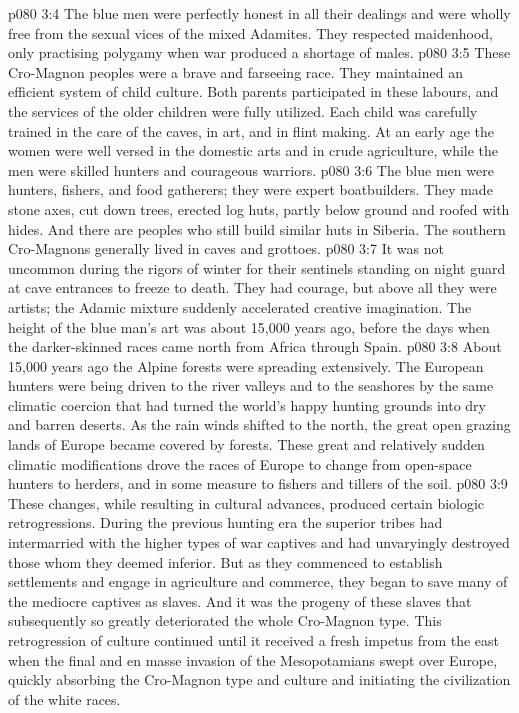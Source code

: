 \vs p080 3:4 The blue men were perfectly honest in all their dealings and were wholly free from the sexual vices of the mixed Adamites. They respected maidenhood, only practising polygamy when war produced a shortage of males.
\vs p080 3:5 These Cro\hyp{}Magnon peoples were a brave and farseeing race. They maintained an efficient system of child culture. Both parents participated in these labours, and the services of the older children were fully utilized. Each child was carefully trained in the care of the caves, in art, and in flint making. At an early age the women were well versed in the domestic arts and in crude agriculture, while the men were skilled hunters and courageous warriors.
\vs p080 3:6 The blue men were hunters, fishers, and food gatherers; they were expert boatbuilders. They made stone axes, cut down trees, erected log huts, partly below ground and roofed with hides. And there are peoples who still build similar huts in Siberia. The southern Cro\hyp{}Magnons generally lived in caves and grottoes.
\vs p080 3:7 It was not uncommon during the rigors of winter for their sentinels standing on night guard at cave entrances to freeze to death. They had courage, but above all they were artists; the Adamic mixture suddenly accelerated creative imagination. The height of the blue man’s art was about 15,000 years ago, before the days when the darker\hyp{}skinned races came north from Africa through Spain.
\vs p080 3:8 \pc About 15,000 years ago the Alpine forests were spreading extensively. The European hunters were being driven to the river valleys and to the seashores by the same climatic coercion that had turned the world’s happy hunting grounds into dry and barren deserts. As the rain winds shifted to the north, the great open grazing lands of Europe became covered by forests. These great and relatively sudden climatic modifications drove the races of Europe to change from open\hyp{}space hunters to herders, and in some measure to fishers and tillers of the soil.
\vs p080 3:9 These changes, while resulting in cultural advances, produced certain biologic retrogressions. During the previous hunting era the superior tribes had intermarried with the higher types of war captives and had unvaryingly destroyed those whom they deemed inferior. But as they commenced to establish settlements and engage in agriculture and commerce, they began to save many of the mediocre captives as slaves. And it was the progeny of these slaves that subsequently so greatly deteriorated the whole Cro\hyp{}Magnon type. This retrogression of culture continued until it received a fresh impetus from the east when the final and en masse invasion of the Mesopotamians swept over Europe, quickly absorbing the Cro\hyp{}Magnon type and culture and initiating the civilization of the white races.

